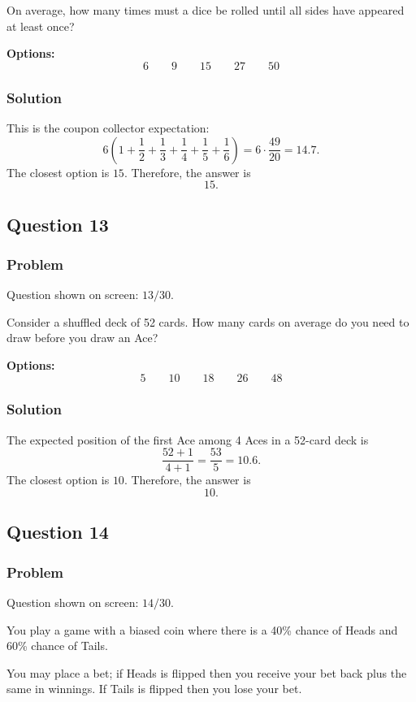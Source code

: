 \documentclass[12pt]{article}
\begin{document}
On average, how many times must a dice be rolled until all sides have appeared at least once?

\noindent\textbf{Options:}
\[
\boxed{6}
\qquad
\boxed{9}
\qquad
\boxed{15}
\qquad
\boxed{27}
\qquad
\boxed{50}
\]

\subsubsection{Solution}
This is the coupon collector expectation:
\[
6\left(1+\frac12+\frac13+\frac14+\frac15+\frac16\right)
=6\cdot \frac{49}{20}=14.7.
\]
The closest option is \(15\). Therefore, the answer is
\[
\boxed{15}.
\]

\subsection{Question 13}
\subsubsection{Problem}
Question shown on screen: \(13/30\).

Consider a shuffled deck of 52 cards. How many cards on average do you need to draw before you draw an Ace?

\noindent\textbf{Options:}
\[
\boxed{5}
\qquad
\boxed{10}
\qquad
\boxed{18}
\qquad
\boxed{26}
\qquad
\boxed{48}
\]

\subsubsection{Solution}
The expected position of the first Ace among 4 Aces in a 52-card deck is
\[
\frac{52+1}{4+1}=\frac{53}{5}=10.6.
\]
The closest option is \(10\). Therefore, the answer is
\[
\boxed{10}.
\]

\subsection{Question 14}
\subsubsection{Problem}
Question shown on screen: \(14/30\).

You play a game with a biased coin where there is a 40\% chance of Heads and 60\% chance of Tails.

You may place a bet; if Heads is flipped then you receive your bet back plus the same in winnings. If Tails is flipped then you lose your bet.
\end{document}
